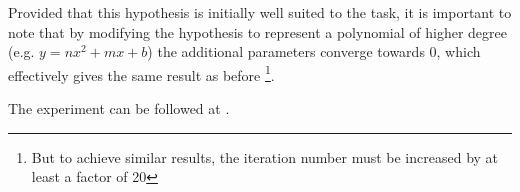 Provided that this hypothesis is initially well suited to the task, it is important to note that by modifying the hypothesis to represent a polynomial of higher degree (e.g. $y = nx^2 + mx + b$) the additional parameters converge towards 0, which effectively gives the same result as before \footnote{But to achieve similar results, the iteration number must be increased by at least a factor of 20}.

The experiment can be followed at .
